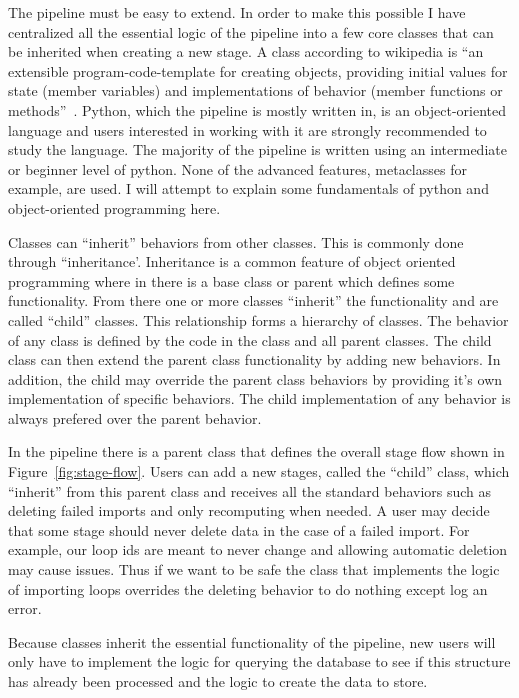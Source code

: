 The pipeline must be easy to extend. In order to make this possible I have
centralized all the essential logic of the pipeline into a few core classes that
can be inherited when creating a new stage. A class according to wikipedia is
``an extensible program-code-template for creating objects, providing initial
values for state (member variables) and implementations of behavior (member
functions or methods''~\cite{Wiki2016}. Python, which the pipeline is mostly
written in, is an object-oriented language and users interested in working with
it are strongly recommended to study the language. The majority of the pipeline
is written using an intermediate or beginner level of python. None of the
advanced features, metaclasses for example, are used. I will attempt to explain
some fundamentals of python and object-oriented programming here.

Classes can ``inherit'' behaviors from other classes. This is commonly done
through ``inheritance'. Inheritance is a common feature of object oriented
programming where in there is a base class or parent which defines some
functionality. From there one or more classes ``inherit'' the functionality and
are called ``child'' classes. This relationship forms a hierarchy of classes. The
behavior of any class is defined by the code in the class and all parent
classes. The child class can then extend the parent class functionality by
adding new behaviors. In addition, the child may override the parent class
behaviors by providing it's own implementation of specific behaviors. The child
implementation of any behavior is always prefered over the parent behavior.

In the pipeline there is a parent class that defines the overall stage flow
shown in Figure~\ref{fig:stage-flow}. Users can add a  new stages, called the
``child'' class, which ``inherit'' from this parent class and receives all the
standard behaviors such as deleting failed imports and only recomputing when
needed. A user may decide that some stage should never delete data in the case
of a failed import. For example, our loop ids are meant to never change and
allowing automatic deletion may cause issues. Thus if we want to be safe the
class that implements the logic of importing loops overrides the deleting
behavior to do nothing except log an error.

Because classes inherit the essential functionality of the pipeline, new users
will only have to implement the logic for querying the database to see if this
structure has already been processed and the logic to create the data to store. 

